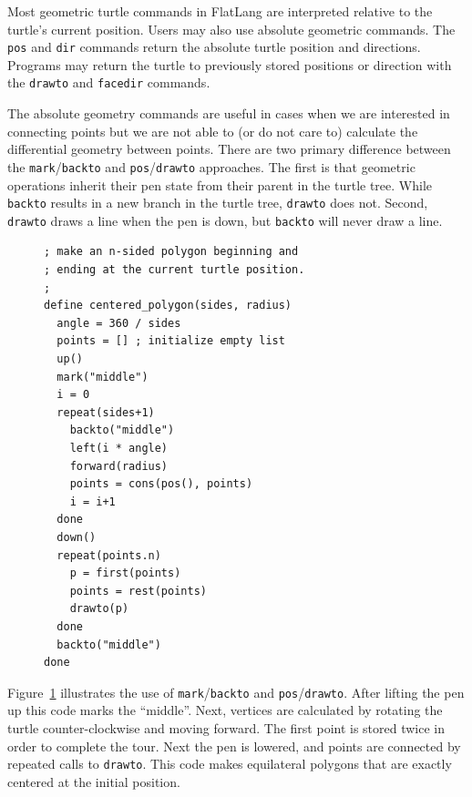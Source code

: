 \documentclass[times, 10pt,twocolumn]{article}
\makeatletter
\newenvironment{subfloat}%
{\def\caption##1{\gdef\subcapsave{\relax##1}}%
\let\subcapsave=\@empty %
\let\sf@oldlabel=\label 
\def\label##1{\xdef\sublabsave{\noexpand\label{##1}}}%
\let\sublabsave\relax %
\setbox\subfigbox\hbox 
\bgroup}%
{\egroup %
\let\label=\sf@oldlabel 
\subfigure[\subcapsave]{\box\subfigbox}}%
\makeatother
\begin{document}
Most geometric turtle commands in \nohyphens{FlatLang} are interpreted
relative to the turtle's current position. Users may also use absolute
geometric commands. The \textnhtt{pos} and \textnhtt{dir} commands
return the absolute turtle position and directions. Programs may
return the turtle to previously stored positions or direction with the
\textnhtt{drawto} and \textnhtt{facedir} commands.

The absolute geometry commands are useful in cases when we are
interested in connecting points but we are not able to (or do not care
to) calculate the differential geometry between points. There are two
primary difference between the \textnhtt{mark}/\textnhtt{backto} and
\textnhtt{pos}/\textnhtt{drawto} approaches. The first is that
geometric operations inherit their pen state from their parent in the
turtle tree. While \textnhtt{backto} results in a new branch in the
turtle tree, \textnhtt{drawto} does not. Second, \textnhtt{drawto}
draws a line when the pen is down, but \textnhtt{backto} will never
draw a line.

\begin{figure}
  \begin{subfloat}
    \begin{minipage}{2.6in}
      \small
\begin{verbatim}
; make an n-sided polygon beginning and
; ending at the current turtle position.
;
define centered_polygon(sides, radius)
  angle = 360 / sides
  points = [] ; initialize empty list
  up()
  mark("middle")
  i = 0
  repeat(sides+1)
    backto("middle")
    left(i * angle)
    forward(radius)
    points = cons(pos(), points)
    i = i+1
  done
  down()
  repeat(points.n)
    p = first(points)
    points = rest(points)
    drawto(p)
  done
  backto("middle")
done
\end{verbatim}
    \end{minipage}
  \end{subfloat}
  \caption{\nohyphens{FlatLang} showing absolute and differential
    geometry as well as \textnhtt{mark} and \textnhtt{backto}.}
  \label{fig:centered_polygon}
\end{figure}

Figure~\ref{fig:centered_polygon} illustrates the use of
\textnhtt{mark}/\textnhtt{backto} and
\textnhtt{pos}/\textnhtt{drawto}. After lifting the pen up this code
marks the ``middle''. Next, vertices are calculated by rotating the
turtle counter-clockwise and moving forward. The first point is stored
twice in order to complete the tour. Next the pen is lowered, and
points are connected by repeated calls to \textnhtt{drawto}. This code
makes equilateral polygons that are exactly centered at the initial
position.
\end{document}
